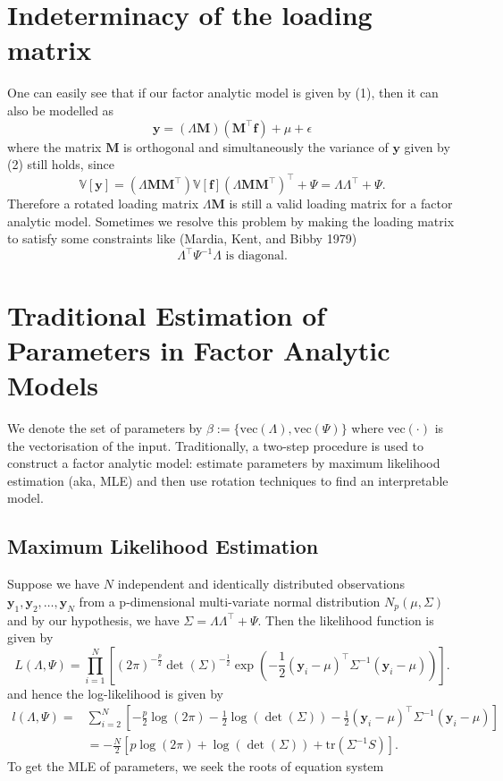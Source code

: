 \documentclass[
  12pt,
]{amsart}
\begin{document}
\section{Indeterminacy of the loading
matrix}\label{indeterminacy-of-the-loading-matrix}

One can easily see that if our factor analytic model is given by (1),
then it can also be modelled as
\[\mathbf{y}=(\Lambda\mathbf{M})(\mathbf{M}^\top\mathbf{f}) +\mu+\epsilon\]
where the matrix \(\mathbf{M}\) is orthogonal and simultaneously the
variance of \(\mathbf{y}\) given by (2) still holds, since
\[\mathbb{V}[\mathbf{y}]=(\Lambda\mathbf{M}\mathbf{M}^\top)\mathbb{V}[\mathbf{f}](\Lambda\mathbf{M}\mathbf{M}^\top)^\top+\Psi=\Lambda\Lambda^\top+\Psi.\]
Therefore a rotated loading matrix \(\Lambda\mathbf{M}\) is still a
valid loading matrix for a factor analytic model. Sometimes we resolve
this problem by making the loading matrix to satisfy some constraints
like (Mardia, Kent, and Bibby 1979)
\[\Lambda^\top \Psi^{-1} \Lambda \text{ is diagonal.}\]

\section{Traditional Estimation of Parameters in Factor Analytic
Models}\label{traditional-estimation-of-parameters-in-factor-analytic-models}

We denote the set of parameters by
\(\beta := \{\text{vec}(\Lambda),\text{vec}(\Psi)\}\) where
\(\text{vec}(\cdot)\) is the vectorisation of the input. Traditionally,
a two-step procedure is used to construct a factor analytic model:
estimate parameters by maximum likelihood estimation (aka, MLE) and then
use rotation techniques to find an interpretable model.

\subsection{Maximum Likelihood
Estimation}\label{maximum-likelihood-estimation}

Suppose we have \(N\) independent and identically distributed
observations \(\mathbf{y}_1,\mathbf{y}_2,\dots,\mathbf{y}_N\) from a
p-dimensional multi-variate normal distribution \(N_p(\mu,\Sigma)\) and
by our hypothesis, we have \(\Sigma=\Lambda\Lambda^\top+\Psi\). Then the
likelihood function is given by
\[L(\Lambda,\Psi)=\prod^N_{i=1}\left[(2\pi)^{-\frac{p}{2}}\det(\Sigma)^{-\frac{1}{2}}\exp(-\frac{1}{2}(\mathbf{y}_i-\mu)^\top\Sigma^{-1}(\mathbf{y}_i-\mu))\right].\]
and hence the log-likelihood is given by \begin{align*}
l(\Lambda,\Psi)=& \sum^N_{i=2}[-\frac{p}{2}\log(2\pi)-\frac{1}{2}\log(\det(\Sigma))-\frac{1}{2}(\mathbf{y}_i-\mu)^\top\Sigma^{-1}(\mathbf{y}_i-\mu)]\\
&= -\frac{N}{2}[p\log(2\pi)+\log(\det(\Sigma))+\text{tr}(\Sigma^{-1}S)].
\end{align*} To get the MLE of parameters, we seek the roots of equation
system
\end{document}
